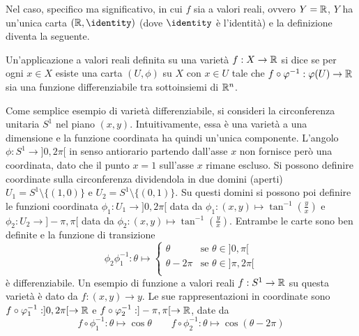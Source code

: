 Nel caso, specifico ma significativo, in cui $f$ sia a valori reali, ovvero $Y = \mathbb{R}$, $Y$ ha un'unica carta $(\R, \identity)$ (dove $\identity$ è l'identità) e la definizione diventa la seguente.
\begin{definition}
  Un'applicazione a valori reali definita su una varietà $f:X\to \mathbb{R}$ si dice  se per ogni $x \in X$ esiste una carta $(U, \phi)$ su $X$ con $x \in  U$ tale che $f\circ \varphi^{-1}: \varphi(U) \to \mathbb{R}$ sia una funzione differenziabile tra sottoinsiemi di $\mathbb{R}^{n}$.
\end{definition}

Come semplice esempio di varietà differenziabile, si consideri la circonferenza unitaria $S^1$ nel piano $(x,y)$. Intuitivamente, essa è una varietà a una dimensione e la funzione coordinata ha quindi un'unica componente. L'angolo $\phi: S^1 \to ]0,2 \pi[$ in senso antiorario partendo dall'asse $x$ non fornisce però una coordinata, dato che il punto $x=1$ sull'asse $x$ rimane escluso. Si possono definire coordinate sulla circonferenza dividendola in due domini (aperti) $U_1 = S^1 \setminus \{(1,0)\}$ e $U_2 = S^1 \setminus \{(0,1)\}$. Su questi domini si possono poi definire le funzioni coordinata $\phi_1: U_1 \to ]0,2 \pi[$ data da $\phi_1: (x,y)\mapsto \tan^{-1}(\frac{y}{x})$ e $\phi_2: U_2 \to ]-\pi,\pi[$ data da $\phi_2: (x,y)\mapsto \tan^{-1}(\frac{y}{x})$. Entrambe le carte sono ben definite e la funzione di transizione
\begin{equation*}
\phi_2\phi_1^{-1}: \theta \mapsto  \begin{cases}
  \theta & \text{se } \theta \in ]0, \pi[\\
  \theta-2\pi & \text{se } \theta \in ]\pi, 2\pi[\\
\end{cases}
\end{equation*}
è differenziabile. Un esempio di funzione a valori reali $f:S^1 \to \mathbb{R}$ su questa varietà è dato da $f:(x,y)\to y$. Le sue rappresentazioni in coordinate sono $f \circ \varphi_1^{-1}: ]0, 2\pi[ \to \mathbb{R}$ e $f \circ \varphi_2^{-1}: ]- \pi, \pi[ \to \mathbb{R}$, date da
\begin{equation*}
f \circ \phi_1^{-1}: \theta \mapsto \cos \theta \qquad f \circ \phi_2^{-1}: \theta \mapsto \cos(\theta - 2 \pi)
\end{equation*} 

